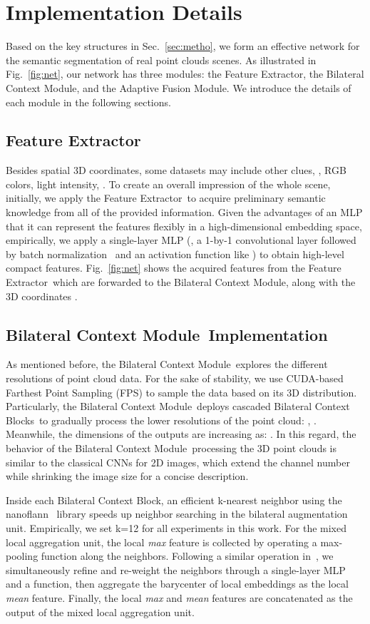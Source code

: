 \documentclass[10pt,twocolumn,letterpaper]{article}
\def\ourencoder{Bilateral Context Module}
\def\ourblock{Bilateral Context Block}
\def\ourblocks{Bilateral Context Blocks}
\def\ourdecoder{Adaptive Fusion Module}
\def\ourextractor{Feature Extractor}
\begin{document}
%
 \section{Implementation Details}
\label{sec:impl}
Based on the key structures in Sec.~\ref{sec:metho}, we form an effective network for the semantic segmentation of real point clouds scenes. As illustrated in Fig.~\ref{fig:net}, our network has three modules: the \ourextractor, the \ourencoder, and the \ourdecoder. We introduce the details of each module in the following sections.

\subsection{\ourextractor}
\label{sec:impl_extractor}
Besides spatial 3D coordinates, some datasets may include other clues, \eg, RGB colors, light intensity, \etc. To create an overall impression of the whole scene, initially, we apply the \ourextractor~to acquire preliminary semantic knowledge from all of the provided information. Given the advantages of an MLP that it can represent the features flexibly in a high-dimensional embedding space, empirically, we apply a single-layer MLP (\ie, a 1-by-1 convolutional layer followed by  batch normalization~\cite{ioffe2015batch} and an activation function like ) to obtain high-level compact features. Fig.~\ref{fig:net} shows the acquired features  from the \ourextractor~which are forwarded to the \ourencoder, along with the 3D coordinates .

\subsection{\ourencoder~Implementation}
\label{sec:impl_encoder}
As mentioned before, the \ourencoder~explores the different resolutions of point cloud data. For the sake of stability, we use CUDA-based Farthest Point Sampling (FPS) to sample the data based on its 3D distribution. Particularly, the \ourencoder~deploys cascaded \ourblocks~to gradually process the lower resolutions of the point cloud: \eg, . Meanwhile, the dimensions of the outputs are increasing as: . In this regard, the behavior of the \ourencoder~processing the 3D point clouds is similar to the classical CNNs for 2D images, which extend the channel number while shrinking the image size for a concise description.

Inside each \ourblock, an efficient k-nearest neighbor using the nanoflann~\cite{blanco2014nanoflann} library speeds up neighbor searching in the bilateral augmentation unit. Empirically, we set k=12 for all experiments in this work. For the mixed local aggregation unit, the local \emph{max} feature is collected by operating a max-pooling function along the neighbors. Following a similar operation in~\cite{hu2020randla}, we simultaneously refine and re-weight the neighbors through a single-layer MLP and a  function, then aggregate the barycenter of local embeddings as the local \emph{mean} feature. Finally, the local \emph{max} and \emph{mean} features are concatenated as the output of the mixed local aggregation unit.
\end{document}
